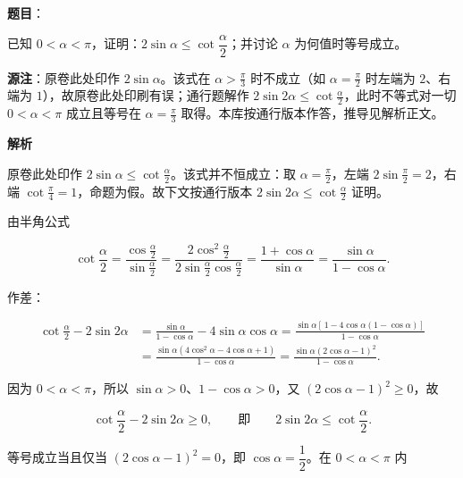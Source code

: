 \begin{answer}

\textbf{题目}：

已知 $0<\alpha<\pi$，证明：$2\sin\alpha\leqslant\cot\dfrac{\alpha}{2}$；并讨论 $\alpha$ 为何值时等号成立。

\begin{gktip}
\textbf{源注}：原卷此处印作 $2\sin\alpha$。该式在 $\alpha>\frac{\pi}{3}$ 时不成立（如 $\alpha=\frac{\pi}{2}$ 时左端为 $2$、右端为 $1$），故原卷此处印刷有误；通行题解作 $2\sin 2\alpha\leqslant\cot\frac{\alpha}{2}$，此时不等式对一切 $0<\alpha<\pi$ 成立且等号在 $\alpha=\frac{\pi}{3}$ 取得。本库按通行版本作答，推导见解析正文。
\end{gktip}

\textbf{解析}

\begin{gktip}
原卷此处印作 $2\sin\alpha\leqslant\cot\frac{\alpha}{2}$。该式并不恒成立：取 $\alpha=\frac{\pi}{2}$，左端 $2\sin\frac\pi2=2$，右端 $\cot\frac\pi4=1$，命题为假。故下文按通行版本 $2\sin2\alpha\leqslant\cot\frac{\alpha}{2}$ 证明。
\end{gktip}

由半角公式

\nopagebreak[4]
\[
\cot\frac{\alpha}{2}=\frac{\cos\frac{\alpha}{2}}{\sin\frac{\alpha}{2}}
=\frac{2\cos^2\frac{\alpha}{2}}{2\sin\frac{\alpha}{2}\cos\frac{\alpha}{2}}
=\frac{1+\cos\alpha}{\sin\alpha}
=\frac{\sin\alpha}{1-\cos\alpha}.
\]

作差：

\nopagebreak[4]
\[
\begin{aligned}
\cot\frac{\alpha}{2}-2\sin2\alpha
&=\frac{\sin\alpha}{1-\cos\alpha}-4\sin\alpha\cos\alpha
=\frac{\sin\alpha\left[\,1-4\cos\alpha\left(1-\cos\alpha\right)\right]}{1-\cos\alpha}\\
&=\frac{\sin\alpha\left(4\cos^2\alpha-4\cos\alpha+1\right)}{1-\cos\alpha}
=\frac{\sin\alpha\left(2\cos\alpha-1\right)^2}{1-\cos\alpha}.
\end{aligned}
\]

因为 $0<\alpha<\pi$，所以 $\sin\alpha>0$、$1-\cos\alpha>0$，又 $\left(2\cos\alpha-1\right)^2\geqslant0$，故

\nopagebreak[4]
\[
\cot\frac{\alpha}{2}-2\sin2\alpha\geqslant0,
\qquad\text{即}\qquad
2\sin2\alpha\leqslant\cot\frac{\alpha}{2}.
\]

等号成立当且仅当 $\left(2\cos\alpha-1\right)^2=0$，即 $\cos\alpha=\dfrac12$。在 $0<\alpha<\pi$ 内


\end{answer}
